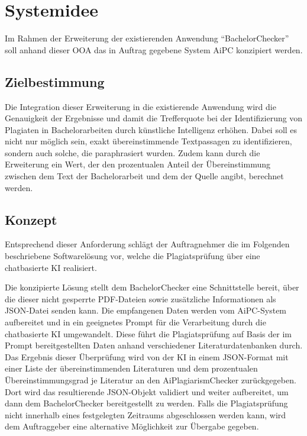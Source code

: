 \chapter{Systemidee}\label{ch:systemidee}

Im Rahmen der Erweiterung der existierenden Anwendung “BachelorChecker” soll anhand dieser \ac{OOA} das in Auftrag gegebene System \ac{AiPC} konzipiert werden.

\section{Zielbestimmung}\label{sec:zielbestimmung}

Die Integration dieser Erweiterung in die existierende Anwendung wird die Genauigkeit der Ergebnisse und damit die Trefferquote bei der Identifizierung von Plagiaten in Bachelorarbeiten durch künstliche Intelligenz erhöhen.
Dabei soll es nicht nur möglich sein, exakt übereinstimmende Textpassagen zu identifizieren, sondern auch solche, die paraphrasiert wurden.
Zudem kann durch die Erweiterung ein Wert, der den prozentualen Anteil der Übereinstimmung zwischen dem Text der Bachelorarbeit und dem der Quelle angibt, berechnet werden.

\section{Konzept}\label{sec:konzept}

Entsprechend dieser Anforderung schlägt der Auftragnehmer die im Folgenden beschriebene Softwarelösung vor, welche die Plagiatsprüfung über eine chatbasierte KI realisiert.

Die konzipierte Lösung stellt dem BachelorChecker eine Schnittstelle bereit, über die dieser nicht gesperrte \ac{PDF}-Dateien sowie zusätzliche Informationen als \ac{JSON}-Datei senden kann.
Die empfangenen Daten werden vom \ac{AiPC}-System aufbereitet und in ein geeignetes Prompt für die Verarbeitung durch die chatbasierte \ac{KI} umgewandelt.
Diese führt die Plagiatsprüfung auf Basis der im Prompt bereitgestellten Daten anhand verschiedener Literaturdatenbanken durch.
Das Ergebnis dieser Überprüfung wird von der \ac{KI} in einem JSON-Format mit einer Liste der übereinstimmenden Literaturen und dem prozentualen Übereinstimmungsgrad je Literatur an den AiPlagiarismChecker zurückgegeben.
Dort wird das resultierende \ac{JSON}-Objekt validiert und weiter aufbereitet, um dann dem BachelorChecker bereitgestellt zu werden.
Falls die Plagiatsprüfung nicht innerhalb eines festgelegten Zeitraums abgeschlossen werden kann, wird dem Auftraggeber eine alternative Möglichkeit zur Übergabe gegeben.

